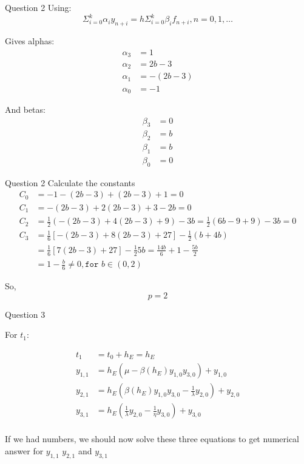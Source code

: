 \documentclass{beamer}
\begin{document}
\begin{frame}{Question 2}
Using:\\
$$\Sigma_{i=0}^{k}\alpha_iy_{n+i} = h \Sigma_{i=0}^{k} \beta_i f_{n+i}, n=0,1,\ldots$$

Gives alphas:
\begin{align*}
\alpha_3 &= 1\\ 
\alpha_2 &= 2b - 3\\
\alpha_1 &= -(2b - 3)\\
\alpha_0 &= -1
\end{align*}

And betas:
\begin{align*}
\beta_3 &= 0\\
\beta_2 &= b\\
\beta_1 &= b\\
\beta_0 &= 0
\end{align*}

\end{frame}

\begin{frame}{Question 2}
Calculate the constants
\begin{align*}
C_0 &= -1 - (2b - 3) + (2b - 3) + 1 = 0\\
C_1 &= -(2b - 3) + 2(2b-3) + 3 - 2b = 0\\
C_2 &= \frac{1}{2}(-(2b-3) + 4(2b-3) + 9) - 3b = \frac{1}{2} (6b - 9 + 9) - 3b = 0\\
C_3 &= \frac{1}{6}[-(2b-3) + 8(2b-3) + 27] - \frac{1}{2}(b+4b)\\
    &= \frac{1}{6}[7(2b-3) + 27] - \frac{1}{2}5b = \frac{14b}{6} + 1 - \frac{5b}{2}\\
    &= 1 - \frac{b}{6} \ne 0, \texttt{for } b \in (0,2)
\end{align*}

So,
$$p = 2$$

\end{frame}

\begin{frame}{Question 3}


For $t_1$:

\begin{align*}
t_1 &= t_0 + h_E = h_E\\
y_{1,1} &= h_E(\mu - \beta (h_E)y_{1,0}y_{3,0}) + y_{1,0}\\
y_{2,1} &= h_E\left(\beta (h_E)y_{1,0}y_{3,0} - \frac{1}{\lambda}y_{2,0}\right) + y_{2,0}\\
y_{3,1} &= h_E\left(\frac{1}{\lambda}y_{2,0} - \frac{1}{\eta}y_{3,0} \right ) + y_{3,0}\\
\end{align*}

If we had numbers, we should now solve these three equations to get numerical answer for $y_{1,1}$ $y_{2,1}$ and $y_{3,1}$

\end{frame}
\end{document}
